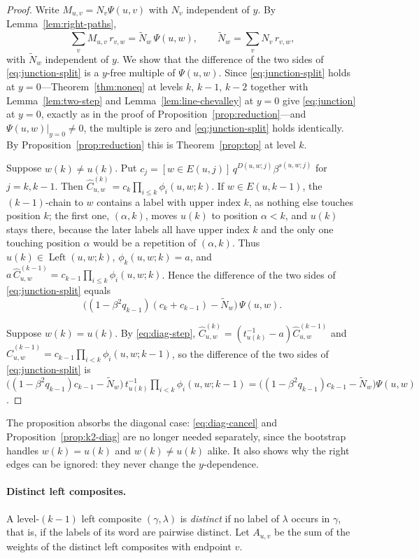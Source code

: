 \documentclass[11pt]{article}
\newcommand{\Left}{\operatorname{Left}}
\begin{document}
\begin{proof}
Write $M_{u,v}=N_v\Psi(u,v)$ with $N_v$ independent of $y$. By
Lemma~\ref{lem:right-paths},
\[
 \sum_vM_{u,v}\,r_{v,w}=\widetilde N_w\,\Psi(u,w),
 \qquad \widetilde N_w=\sum_vN_v\,r_{v,w},
\]
with $\widetilde N_w$ independent of $y$. We show that the difference
of the two sides of \eqref{eq:junction-split} is a $y$-free multiple
of $\Psi(u,w)$. Since \eqref{eq:junction-split}
holds at $y=0$---Theorem~\ref{thm:noneq} at levels $k$, $k-1$, $k-2$
together with Lemma~\ref{lem:two-step} and
Lemma~\ref{lem:line-chevalley} at $y=0$ give \eqref{eq:junction} at
$y=0$, exactly as in the proof of
Proposition~\ref{prop:reduction}---and $\Psi(u,w)|_{y=0}\neq0$, the
multiple is zero and \eqref{eq:junction-split} holds identically. By
Proposition~\ref{prop:reduction} this is Theorem~\ref{prop:top} at
level $k$.

Suppose $w(k)\neq u(k)$. Put
$c_j=[w\in E(u,j)]\,q^{D(u,w;j)}\beta^{s(u,w;j)}$ for $j=k,k-1$. Then
$\widehat C^{(k)}_{u,w}=c_k\prod_{i\leq k}\phi_i(u,w;k)$. If
$w\in E(u,k-1)$, the $(k-1)$-chain to $w$ contains a label with upper
index $k$, as nothing else touches position $k$; the first one,
$(\alpha,k)$, moves $u(k)$ to position $\alpha<k$, and $u(k)$ stays
there, because the later labels all have upper index $k$ and the only
one touching position $\alpha$ would be a repetition of
$(\alpha,k)$. Thus $u(k)\in\Left(u,w;k)$, $\phi_k(u,w;k)=a$, and
$a\,\widehat C^{(k-1)}_{u,w}=c_{k-1}\prod_{i\leq k}\phi_i(u,w;k)$.
Hence the difference of the two sides of \eqref{eq:junction-split} equals
\[
 \bigl((1-\beta^2q_{k-1})(c_k+c_{k-1})-\widetilde N_w\bigr)\,\Psi(u,w).
\]

Suppose $w(k)=u(k)$. By \eqref{eq:diag-step},
$\widehat C^{(k)}_{u,w}=(t^{-1}_{u(k)}-a)\widehat C^{(k-1)}_{u,w}$ and
$\widehat C^{(k-1)}_{u,w}=c_{k-1}\prod_{i<k}\phi_i(u,w;k-1)$, so the
difference of the two sides of \eqref{eq:junction-split} is
$\bigl((1-\beta^2q_{k-1})c_{k-1}-\widetilde N_w\bigr)\,
 t^{-1}_{u(k)}\prod_{i<k}\phi_i(u,w;k-1)
 =\bigl((1-\beta^2q_{k-1})c_{k-1}-\widetilde N_w\bigr)\Psi(u,w)$.
\end{proof}

The proposition absorbs the diagonal case: \eqref{eq:diag-cancel} and
Proposition~\ref{prop:k2-diag} are no longer needed separately, since
the bootstrap handles $w(k)=u(k)$ and $w(k)\neq u(k)$ alike. It also
shows why the right edges can be ignored: they never change the
$y$-dependence.

\paragraph{Distinct left composites.}
A level-$(k-1)$ left composite $(\gamma,\lambda)$ is \emph{distinct}
if no label of $\lambda$ occurs in $\gamma$, that is, if the labels of
its word are pairwise distinct. Let $A_{u,v}$ be the sum of the
weights of the distinct left composites with endpoint $v$.
\end{document}
